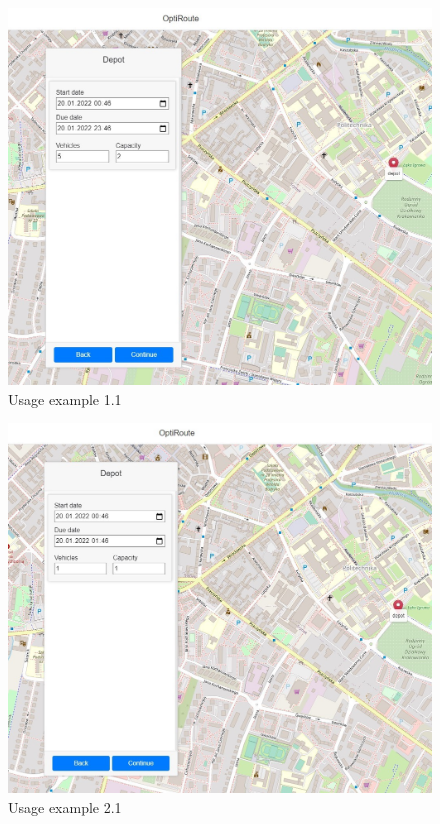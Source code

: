 \documentclass[a4paper,twoside,12pt]{book}
\begin{document}
\begin{figure}[htbp]
\centering
\includegraphics[width=\textwidth]{images/depotScenario1_updated.jpg}
\caption{Usage example 1.1}
\label{fig:depotScenario1}
\end{figure}

\begin{figure}[htbp]
\centering
\includegraphics[width=\textwidth]{images/depotScenario2_updated.jpg}
\caption{Usage example 2.1}
\label{fig:depotScenario2}
\end{figure}
\end{document}
